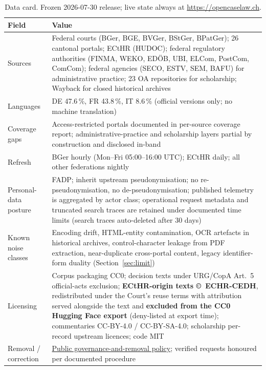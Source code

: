 \documentclass[11pt,a4paper]{article}
\begin{document}
\begin{table}[H]
\centering
\caption{Data card. Frozen 2026-07-30 release; live state always at \url{https://opencaselaw.ch}.}
\label{tab:datacard}
\small
\begin{tabular}{L{0.24\textwidth} L{0.69\textwidth}}
\toprule
\textbf{Field} & \textbf{Value} \\
\midrule
Sources              & Federal courts (BGer, BGE, BVGer, BStGer, BPatGer); 26 cantonal portals; ECtHR (HUDOC); federal regulatory authorities (FINMA, WEKO, ED\"OB, UBI, ELCom, PostCom, ComCom); federal agencies (SECO, ESTV, SEM, BAFU) for administrative practice; 23 OA repositories for scholarship; Wayback for closed historical archives \\
Languages            & DE 47.6\,\%, FR 43.8\,\%, IT 8.6\,\% (official versions only; no machine translation) \\
Coverage gaps        & Access-restricted portals documented in per-source coverage report; administrative-practice and scholarship layers partial by construction and disclosed in-band \\
Refresh              & BGer hourly (Mon--Fri 05:00--16:00 UTC); ECtHR daily; all other federations nightly \\
Personal-data posture & FADP; inherit upstream pseudonymisation; no re-pseudonymisation, no de-pseudonymisation; published telemetry is aggregated by actor class; operational request metadata and truncated search traces are retained under documented time limits (search traces auto-deleted after 30 days) \\
Known noise classes  & Encoding drift, HTML-entity contamination, OCR artefacts in historical archives, control-character leakage from PDF extraction, near-duplicate cross-portal content, legacy identifier-form duality (Section~\ref{sec:limit}) \\
Licensing            & Corpus packaging CC0; decision texts under URG/CopA Art.~5 official-acts exclusion; \textbf{ECtHR-origin texts \copyright~ECHR-CEDH}, redistributed under the Court's reuse terms with attribution served alongside the text and \textbf{excluded from the CC0 Hugging Face export} (deny-listed at export time); commentaries CC-BY-4.0 / CC-BY-SA-4.0; scholarship per-record upstream licences; code MIT \\
Removal / correction & \href{https://github.com/jonashertner/caselaw-repo-1/blob/main/docs/governance-and-removal-policy.md}{Public governance-and-removal policy}; verified requests honoured per documented procedure \\
\bottomrule
\end{tabular}
\end{table}
\end{document}
